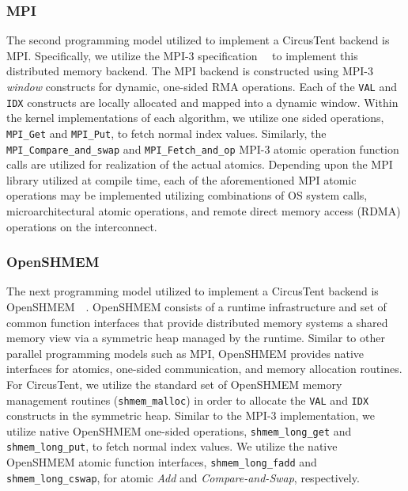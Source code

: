 \subsubsection{MPI}
\label{subsubsec:mpi}

The second programming model utilized to implement a CircusTent backend is MPI.  
Specifically, we utilize the MPI-3 specification~\cite{mpi-3.0}~\cite{10.1007/978-3-642-33518-1_1} to implement this distributed memory backend.
The MPI backend is constructed using MPI-3 \textit{window} constructs for dynamic, one-sided RMA operations.
Each of the \texttt{VAL} and \texttt{IDX} constructs are locally allocated and mapped into a dynamic window.
Within the kernel implementations of each algorithm, we utilize one sided operations, \texttt{MPI\_Get} and \texttt{MPI\_Put}, to fetch normal index values.
Similarly, the \texttt{MPI\_Compare\_and\_swap} and \texttt{MPI\_Fetch\_and\_op} MPI-3 atomic operation function calls are utilized for realization of the actual atomics.
Depending upon the MPI library utilized at compile time, each of the aforementioned MPI atomic operations may be implemented utilizing combinations of OS system calls, microarchitectural atomic 
operations, and remote direct memory access (RDMA) operations on the interconnect.  

\subsubsection{OpenSHMEM}
\label{subsubsec:openshmem}

The next programming model utilized to implement a CircusTent backend is OpenSHMEM~\cite{openshmemspec}~\cite{Poole2011}.
OpenSHMEM consists of a runtime infrastructure and set of common function interfaces that provide distributed memory systems a shared memory view via a symmetric heap managed by the runtime.  
Similar to other parallel programming models such as MPI, OpenSHMEM provides native interfaces for atomics, one-sided communication, and memory allocation routines.
For CircusTent, we utilize the standard set of OpenSHMEM memory management routines (\texttt{shmem\_malloc}) in order to allocate the \texttt{VAL} and \texttt{IDX} constructs in the symmetric heap.
Similar to the MPI-3 implementation, we utilize native OpenSHMEM one-sided operations, \texttt{shmem\_long\_get} and \texttt{shmem\_long\_put}, to fetch normal index values.
We utilize the native OpenSHMEM atomic function interfaces, \texttt{shmem\_long\_fadd} and \texttt{shmem\_long\_cswap}, for atomic \textit{Add} and \textit{Compare-and-Swap}, respectively.  

